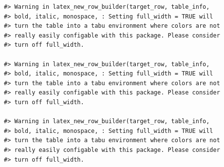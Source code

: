 \documentclass[
]{book}
\begin{document}
\begin{verbatim}
#> Warning in latex_new_row_builder(target_row, table_info,
#> bold, italic, monospace, : Setting full_width = TRUE will
#> turn the table into a tabu environment where colors are not
#> really easily configable with this package. Please consider
#> turn off full_width.

#> Warning in latex_new_row_builder(target_row, table_info,
#> bold, italic, monospace, : Setting full_width = TRUE will
#> turn the table into a tabu environment where colors are not
#> really easily configable with this package. Please consider
#> turn off full_width.

#> Warning in latex_new_row_builder(target_row, table_info,
#> bold, italic, monospace, : Setting full_width = TRUE will
#> turn the table into a tabu environment where colors are not
#> really easily configable with this package. Please consider
#> turn off full_width.
\end{verbatim}
\end{document}
